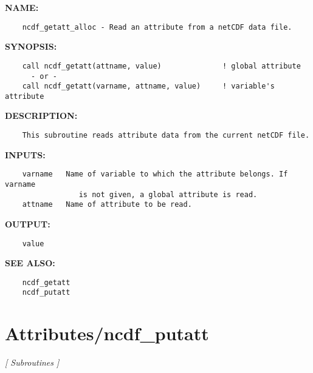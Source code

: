 \label{ch:robo1}
\label{ch:Attributes_ncdf_getatt_alloc}
\textbf{NAME:}\hspace{0.08in}\begin{Verbatim}
    ncdf_getatt_alloc - Read an attribute from a netCDF data file.
\end{Verbatim}
\textbf{SYNOPSIS:}\hspace{0.08in}\begin{Verbatim}
    call ncdf_getatt(attname, value)              ! global attribute
      - or -
    call ncdf_getatt(varname, attname, value)     ! variable's attribute
\end{Verbatim}
\textbf{DESCRIPTION:}\hspace{0.08in}\begin{Verbatim}
    This subroutine reads attribute data from the current netCDF file.
\end{Verbatim}
\textbf{INPUTS:}\hspace{0.08in}\begin{Verbatim}
    varname   Name of variable to which the attribute belongs. If varname
                 is not given, a global attribute is read.
    attname   Name of attribute to be read.
\end{Verbatim}
\textbf{OUTPUT:}\hspace{0.08in}\begin{Verbatim}
    value
\end{Verbatim}
\textbf{SEE ALSO:}\hspace{0.08in}\begin{Verbatim}
    ncdf_getatt
    ncdf_putatt
\end{Verbatim}
\section{Attributes/ncdf\_putatt}
\textsl{[ Subroutines ]}

